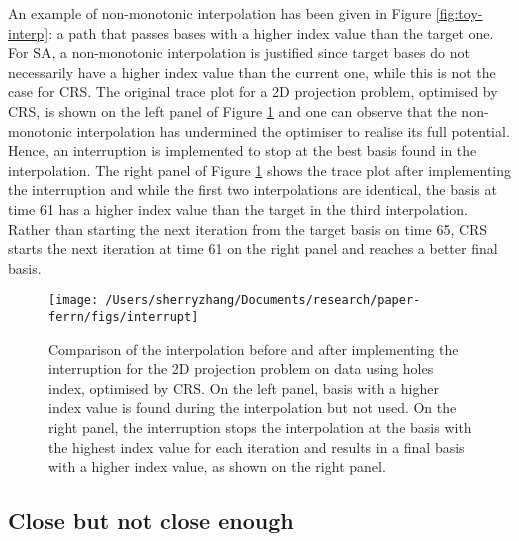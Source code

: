 An example of non-monotonic interpolation has been given in Figure
\ref{fig:toy-interp}: a path that passes bases with a higher index value
than the target one. For SA, a non-monotonic interpolation is justified
since target bases do not necessarily have a higher index value than the
current one, while this is not the case for CRS. The original trace plot
for a 2D projection problem, optimised by CRS, is shown on the left
panel of Figure \ref{fig:interruption} and one can observe that the
non-monotonic interpolation has undermined the optimiser to realise its
full potential. Hence, an interruption is implemented to stop at the
best basis found in the interpolation. The right panel of Figure
\ref{fig:interruption} shows the trace plot after implementing the
interruption and while the first two interpolations are identical, the
basis at time 61 has a higher index value than the target in the third
interpolation. Rather than starting the next iteration from the target
basis on time 65, CRS starts the next iteration at time 61 on the right
panel and reaches a better final basis.

\begin{Schunk}
\begin{figure}

{\centering \texttt{[image: /Users/sherryzhang/Documents/research/paper-ferrn/figs/interrupt]} 

}

\caption[Comparison of the interpolation before and after implementing the interruption for the 2D projection problem on  data using holes index, optimised by CRS]{Comparison of the interpolation before and after implementing the interruption for the 2D projection problem on  data using holes index, optimised by CRS. On the left panel, basis with a higher index value is found during the interpolation but not used. On the right panel, the interruption stops the interpolation at the basis with the highest index value for each iteration and results in a final basis with a higher index value, as shown on the right panel.}\label{fig:interruption}
\end{figure}
\end{Schunk}

\hypertarget{close-but-not-close-enough}{%
\subsection{Close but not close
enough}\label{close-but-not-close-enough}}

